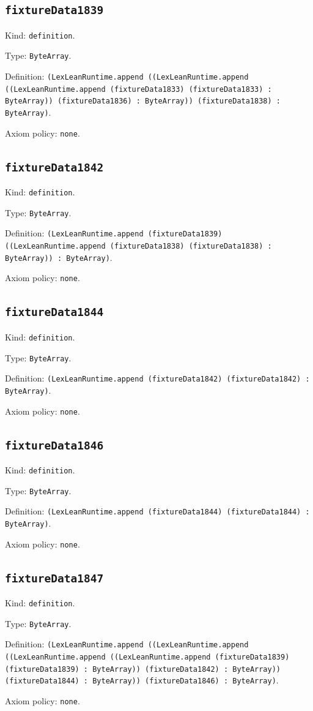 \documentclass[11pt]{article}
\begin{document}
\subsection*{\texttt{fixtureData1839}}
\noindent Kind: \texttt{definition}.\par
\noindent Type: \texttt{ByteArray}.\par
\noindent Definition: \texttt{(LexLeanRuntime.append ((LexLeanRuntime.append ((LexLeanRuntime.append (fixtureData1833) (fixtureData1833) : ByteArray)) (fixtureData1836) : ByteArray)) (fixtureData1838) : ByteArray)}.\par
\noindent Axiom policy: \texttt{none}.\par
\subsection*{\texttt{fixtureData1842}}
\noindent Kind: \texttt{definition}.\par
\noindent Type: \texttt{ByteArray}.\par
\noindent Definition: \texttt{(LexLeanRuntime.append (fixtureData1839) ((LexLeanRuntime.append (fixtureData1838) (fixtureData1838) : ByteArray)) : ByteArray)}.\par
\noindent Axiom policy: \texttt{none}.\par
\subsection*{\texttt{fixtureData1844}}
\noindent Kind: \texttt{definition}.\par
\noindent Type: \texttt{ByteArray}.\par
\noindent Definition: \texttt{(LexLeanRuntime.append (fixtureData1842) (fixtureData1842) : ByteArray)}.\par
\noindent Axiom policy: \texttt{none}.\par
\subsection*{\texttt{fixtureData1846}}
\noindent Kind: \texttt{definition}.\par
\noindent Type: \texttt{ByteArray}.\par
\noindent Definition: \texttt{(LexLeanRuntime.append (fixtureData1844) (fixtureData1844) : ByteArray)}.\par
\noindent Axiom policy: \texttt{none}.\par
\subsection*{\texttt{fixtureData1847}}
\noindent Kind: \texttt{definition}.\par
\noindent Type: \texttt{ByteArray}.\par
\noindent Definition: \texttt{(LexLeanRuntime.append ((LexLeanRuntime.append ((LexLeanRuntime.append ((LexLeanRuntime.append (fixtureData1839) (fixtureData1839) : ByteArray)) (fixtureData1842) : ByteArray)) (fixtureData1844) : ByteArray)) (fixtureData1846) : ByteArray)}.\par
\noindent Axiom policy: \texttt{none}.\par
\end{document}
